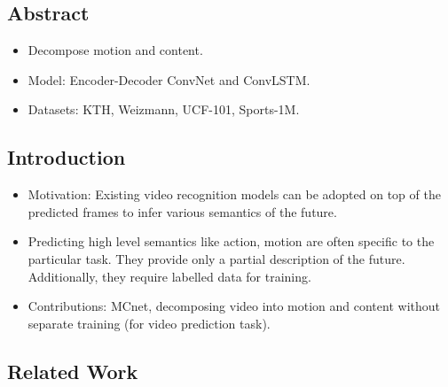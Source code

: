 \documentclass{article}
\begin{document}
    \subsection*{Abstract}
    \begin{itemize}
        \item Decompose motion and content.
        \item Model: Encoder-Decoder ConvNet and ConvLSTM\@.
        \item Datasets: KTH, Weizmann, UCF-101, Sports-1M\@.
    \end{itemize}

    \subsection{Introduction}\label{subsec:Decomposing_Motion_and_Content_for_Natural_Video_Sequence_Prediction:introduction}
    \begin{itemize}
        \item Motivation: Existing video recognition models can be adopted on top of the predicted frames to infer various semantics of the future.
        \item Predicting high level semantics like action, motion are often specific to the particular task.
        They provide only a partial description of the future.
        Additionally, they require labelled data for training.
        \item Contributions: MCnet, decomposing video into motion and content without separate training (for video prediction task).
    \end{itemize}

    \subsection{Related Work}\label{subsec:Decomposing_Motion_and_Content_for_Natural_Video_Sequence_Prediction:related-work}
\end{document}
